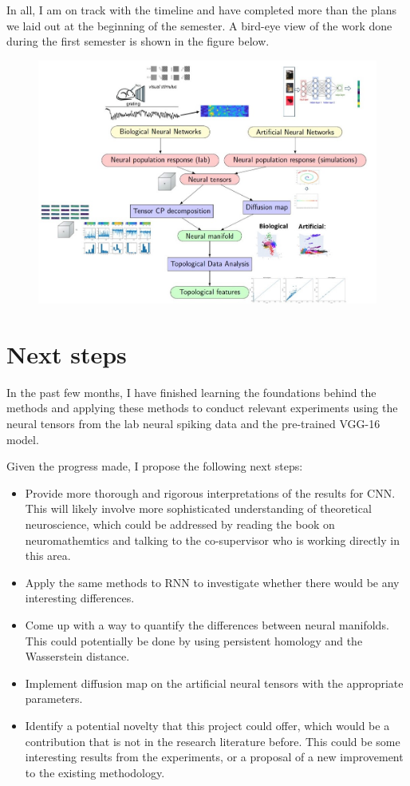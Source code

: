 In all, I am on track with the timeline and have completed more than the plans we laid out at the beginning of the semester.  A bird-eye view of the work done during the first semester is shown in the figure below.

\begin{figure}[H]
        \centering
     \includegraphics[width=1.2\textwidth]{presentation/Slide4.jpg}
        \end{figure} 
        
\section{Next steps}
In the past few months, I have finished learning the foundations behind the methods and applying these methods to conduct relevant experiments using the neural tensors from the lab neural spiking data and the pre-trained VGG-16 model.  

Given the progress made, I propose the following next steps:
\begin{itemize}
    \item Provide more thorough and rigorous interpretations of the results for CNN. This will likely involve more sophisticated understanding of theoretical neuroscience, which could be addressed by reading the book on neuromathemtics and talking to the co-supervisor who is working directly in this area. 
    \item Apply the same methods to RNN to investigate whether there would be any interesting differences.
    \item Come up with a way to quantify the differences between neural manifolds. This could potentially be done by using persistent homology and the Wasserstein distance.
    \item Implement diffusion map on the artificial neural tensors with the appropriate parameters.
    \item Identify a potential novelty that this project could offer, which would be a contribution that is not in the research literature before. This could be some interesting results from the experiments, or a proposal of a new improvement to the existing methodology. 
\end{itemize}


